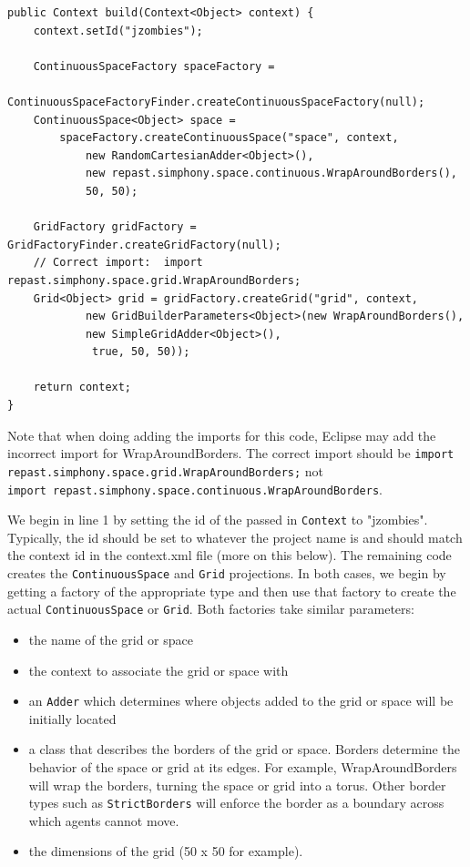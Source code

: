 \documentclass[11pt]{amsart}
\begin{document}
\noindent\begin{minipage}[h]{\textwidth}
\vspace{.2in}
\lstset{language=java,caption=JZombiesBuilder.build 1}
\begin{lstlisting}
public Context build(Context<Object> context) {
	context.setId("jzombies");
	
	ContinuousSpaceFactory spaceFactory = 
		ContinuousSpaceFactoryFinder.createContinuousSpaceFactory(null);
	ContinuousSpace<Object> space = 
		spaceFactory.createContinuousSpace("space", context, 
			new RandomCartesianAdder<Object>(),  
			new repast.simphony.space.continuous.WrapAroundBorders(), 
			50, 50);
	
	GridFactory gridFactory = GridFactoryFinder.createGridFactory(null);
	// Correct import:  import repast.simphony.space.grid.WrapAroundBorders;
	Grid<Object> grid = gridFactory.createGrid("grid", context,
	        new GridBuilderParameters<Object>(new WrapAroundBorders(), 
	        new SimpleGridAdder<Object>(),
	         true, 50, 50));
	         
	return context;
}		    
\end{lstlisting}
\vspace{.2in}
\end{minipage}

Note that when doing adding the imports for this code, Eclipse may add the incorrect import for WrapAroundBorders. The correct import should be \newline \texttt{import repast.simphony.space.grid.WrapAroundBorders;} not \\ \texttt{import repast.simphony.space.continuous.WrapAroundBorders}.

We begin in line 1 by setting the id of the passed in \texttt{Context} to "jzombies". Typically, the id should be set to whatever the project name is and should match the context id in the context.xml file (more on this below). The remaining code creates the \texttt{ContinuousSpace} and \texttt{Grid} projections. In both cases, we begin by getting a factory of the appropriate type and then use that factory to create the actual  \texttt{ContinuousSpace} or \texttt{Grid}. Both factories take similar parameters:

\begin{itemize}
\item the name of the grid or space
\item the context to associate the grid or space with
\item an \texttt{Adder} which determines where objects added to the grid or space will be initially located
\item a class that describes the borders of the grid or space. Borders determine the behavior of the space or grid at its edges. For example, WrapAroundBorders will wrap the borders, turning the space or grid into a torus. Other border types such as \texttt{StrictBorders} will enforce the border as a boundary across which agents cannot move.
\item the dimensions of the grid (50 x 50 for example).
\end{itemize}
\end{document}

